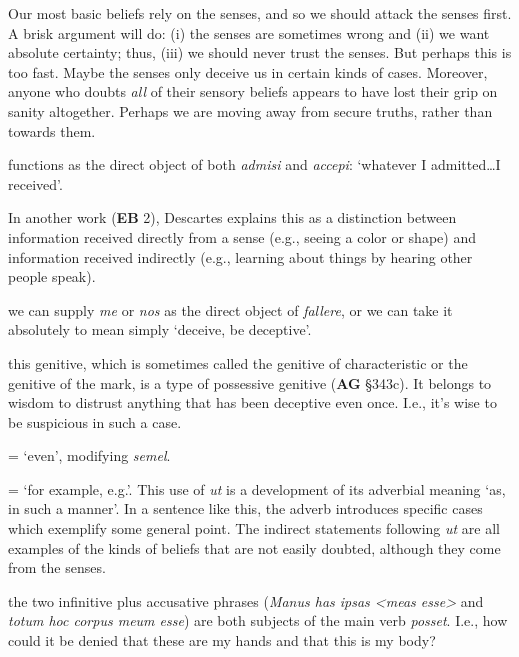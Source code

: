 \prenotes

Our most basic beliefs rely on the senses, and so we should attack the senses first. A brisk argument will do: (i) the senses are sometimes wrong and (ii) we want absolute certainty; thus, (iii) we should never trust the senses. But perhaps this is too fast. Maybe the senses only deceive us in certain kinds of cases. Moreover, anyone who doubts \textit{all} of their sensory beliefs appears to have lost their grip on sanity altogether. Perhaps we are moving away from secure truths, rather than towards them.

 functions as the direct object of both \textit{admisi} and \textit{accepi}: `whatever I admitted\dots I received'.

 In another work (\textbf{EB} 2), Descartes explains this as a distinction between information received directly from a sense (e.g., seeing a color or shape) and information received indirectly (e.g., learning about things by hearing other people speak).

 we can supply \textit{me} or \textit{nos} as the direct object of \textit{fallere}, or we can take it absolutely to mean simply `deceive, be deceptive'.

 this genitive, which is sometimes called the genitive of characteristic or the genitive of the mark, is a type of possessive genitive (\textbf{AG} §343c). It belongs to wisdom to distrust anything that has been deceptive even once. I.e., it's wise to be suspicious in such a case.

 = `even', modifying \textit{semel}.

 = `for example, e.g.'. This use of \textit{ut} is a development of its adverbial meaning `as, in such a manner'. In a sentence like this, the adverb introduces specific cases which exemplify some general point. The indirect statements following \textit{ut} are all examples of the kinds of beliefs that are not easily doubted, although they come from the senses.

 the two infinitive plus accusative phrases (\textit{Manus has ipsas <meas esse>} and \textit{totum hoc corpus meum esse}) are both subjects of the main verb \textit{posset}. I.e., how could it be denied that these are my hands and that this is my body?

